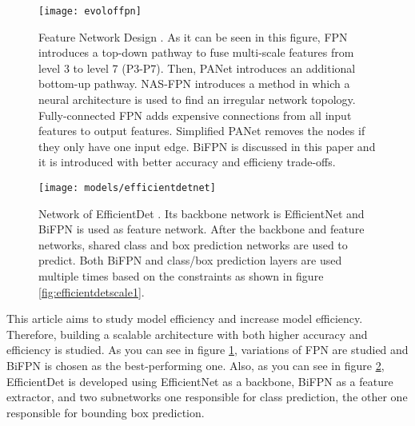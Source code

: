 \documentclass{article}
\begin{document}
\setlength{\parindent}{6ex}


\begin{figure}
    \texttt{[image: evoloffpn]}
    \caption{Feature Network Design \cite{efficientdetcite}. 
    As it can be seen in this figure, FPN introduces a top-down pathway to fuse multi-scale 
    features from level 3 to level 7 (P3-P7). Then, PANet introduces an additional bottom-up 
    pathway. NAS-FPN introduces a method in which a neural architecture is used to find an 
    irregular network topology. Fully-connected FPN adds expensive connections from all input 
    features to output features. Simplified PANet removes the nodes if they only have one input 
    edge. BiFPN is discussed in this paper and it is introduced with better accuracy and efficieny 
    trade-offs.}
    \label{fig:bifpn1}
\end{figure}

\begin{figure}
    \centering
    \texttt{[image: models/efficientdetnet]}
    \caption{Network of EfficientDet \cite{efficientdetcite}. Its backbone network is EfficientNet 
    and BiFPN is used as feature network. After the backbone and feature networks, shared class 
    and box prediction networks are used to predict. Both BiFPN and class/box prediction layers 
    are used multiple times based on the constraints as shown in figure \ref{fig:efficientdetscale1}.}
    \label{fig:efficientdetnet1}
\end{figure}

\indent

This article aims to study model efficiency and increase model 
efficiency. Therefore, building a scalable architecture with both higher 
accuracy and efficiency \cite{efficientdetcite} is studied. As you can see in figure 
\ref{fig:bifpn1}, variations of FPN are studied and BiFPN is chosen as the best-performing 
one. Also, as you can see in figure \ref{fig:efficientdetnet1}, EfficientDet is developed 
using EfficientNet as a backbone, BiFPN as a feature extractor, and two subnetworks 
one responsible for class prediction, the other one responsible for bounding 
box prediction. \par
\end{document}
